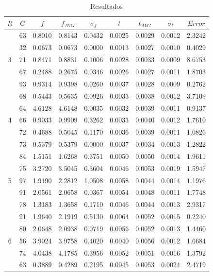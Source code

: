 \documentclass[journal]{IEEEtran}
\begin{document}
\begin{table}[h]
\caption{Resultados}
\centering

\begin{tabular}{|c||c||c|c|c||c|c|c||c|}
\hline
$R$ & $G$ & $f$ & $f_{AVG}$ & $\sigma_f$ & $t$ & $t_{AVG}$ & $\sigma_t$ & $Error$ \\
\hline
\multirow{5}{*}{3} & 63 & 0.8010 & 0.8143 & 0.0432 & 0.0025 & 0.0029 & 0.0012 & 2.3242 \\
                   & 32 & 0.0673 & 0.0673 & 0.0000 & 0.0013 & 0.0027 & 0.0010 & 0.4029 \\
                   & 71 & 0.8471 & 0.8831 & 0.1006 & 0.0028 & 0.0033 & 0.0009 & 8.6753 \\
                   & 67 & 0.2488 & 0.2675 & 0.0346 & 0.0026 & 0.0027 & 0.0011 & 1.8703 \\
                   & 93 & 0.9314 & 0.9398 & 0.0260 & 0.0037 & 0.0028 & 0.0009 & 0.2762 \\ \hline

\multirow{5}{*}{4} & 68 & 0.5443 & 0.5635 & 0.0926 & 0.0033 & 0.0038 & 0.0012 & 3.7109 \\
                   & 64 & 4.6128 & 4.6148 & 0.0035 & 0.0032 & 0.0039 & 0.0011 & 0.9137 \\
                   & 66 & 0.9033 & 0.9909 & 0.3262 & 0.0033 & 0.0040 & 0.0012 & 1.7610 \\
                   & 72 & 0.4688 & 0.5045 & 0.1170 & 0.0036 & 0.0039 & 0.0011 & 1.0826 \\
                   & 73 & 0.5379 & 0.5379 & 0.0000 & 0.0037 & 0.0034 & 0.0013 & 1.2822 \\ \hline
 
\multirow{5}{*}{5} & 84 & 1.5151 & 1.6268 & 0.3751 & 0.0050 & 0.0050 & 0.0014 & 1.9611 \\
                   & 75 & 3.2720 & 3.5045 & 0.3604 & 0.0046 & 0.0053 & 0.0019 & 1.5947 \\
                   & 97 & 1.9190 & 2.2812 & 1.0508 & 0.0058 & 0.0044 & 0.0014 & 1.1976 \\
                   & 91 & 2.0561 & 2.0658 & 0.0367 & 0.0054 & 0.0048 & 0.0011 & 1.7748 \\
                   & 78 & 1.3183 & 1.3658 & 0.1710 & 0.0046 & 0.0044 & 0.0013 & 2.9317 \\ \hline
 
\multirow{5}{*}{6} & 91 & 1.9640 & 2.1919 & 0.5130 & 0.0064 & 0.0052 & 0.0015 & 0.2240 \\
                   & 80 & 2.0648 & 2.0938 & 0.0719 & 0.0056 & 0.0052 & 0.0013 & 1.4460 \\
                   & 56 & 3.9024 & 3.9758 & 0.4020 & 0.0040 & 0.0056 & 0.0012 & 1.6684 \\
                   & 74 & 4.0438 & 4.1785 & 0.3956 & 0.0052 & 0.0051 & 0.0016 & 1.3792 \\
                   & 63 & 0.3889 & 0.4289 & 0.2195 & 0.0045 & 0.0053 & 0.0024 & 2.4719 \\ \hline
 

\end{tabular}
\end{table}
\end{document}
